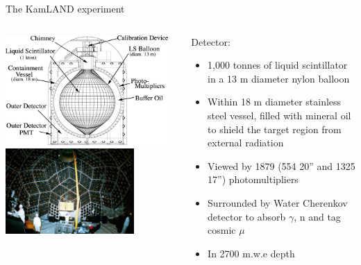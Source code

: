 \begin{frame}[t]{The KamLAND experiment}

\begin{columns}
  \begin{column}{0.50\textwidth}
   \centering
     \includegraphics[width=0.95\textwidth]{./images/3nu/reactor/kamLAND_schematic.png}\\
     \vspace{0.3cm}
     \includegraphics[width=0.75\textwidth]{./images/3nu/reactor/kamLAND_interior_photo.jpg}\\
  \end{column}
  \begin{column}{0.50\textwidth}
     Detector:
     \begin{itemize}
         \item 1,000 tonnes of liquid scintillator in a 13 m diameter nylon balloon
         \item Within 18 m diameter stainless steel vessel, filled with mineral oil to shield the target
               region from external radiation
         \item Viewed by 1879 (554 20'' and 1325 17'') photomultipliers
         \item Surrounded by Water Cherenkov detector to absorb $\gamma$, n and tag cosmic $\mu$
         \item In 2700 m.w.e depth
     \end{itemize}
  \end{column}
\end{columns}
\end{frame}



